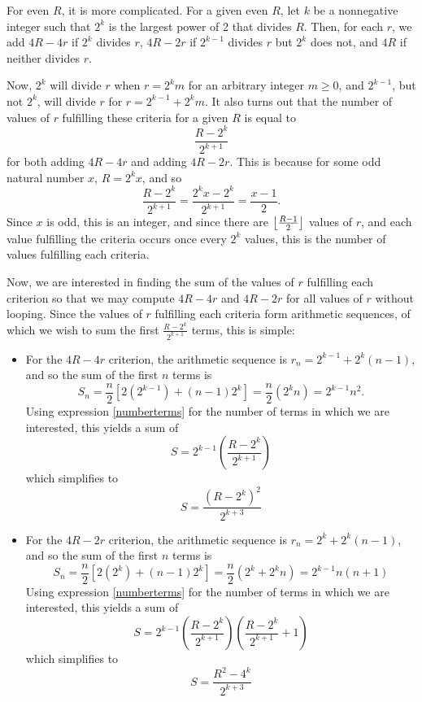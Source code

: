 \documentclass[12pt]{article}
\DeclarePairedDelimiter\floor{\lfloor}{\rfloor}
\begin{document}
For even $R$, it is more complicated. For a given even $R$, let $k$ be a nonnegative integer such that $2^k$ is the largest power of 2 that divides $R$. Then, for each $r$, we add $4R - 4r$ if $2^k$ divides $r$, $4R - 2r$ if $2^{k-1}$ divides $r$ but $2^k$ does not, and $4R$ if neither divides $r$.

Now, $2^k$ will divide $r$ when $r = 2^k m$ for an arbitrary integer $m \ge 0$, and $2^{k-1}$, but not $2^k$, will divide $r$ for $r = 2^{k-1} + 2^k m$. It also turns out that the number of values of $r$ fulfilling these criteria for a given $R$ is equal to
\begin{equation}
  \frac{R - 2^k}{2^{k+1}} \label{numberterms}
\end{equation}
for both adding $4R - 4r$ and adding $4R - 2r$. This is because for some odd natural number $x$, $R = 2^k x$, and so \[ \frac{R - 2^k}{2^{k+1}} = \frac{2^k x - 2^k}{2^{k+1}} = \frac{x - 1}{2}. \] Since $x$ is odd, this is an integer, and since there are $\floor*{\frac{R-1}{2}}$ values of $r$, and each value fulfilling the criteria occurs once every $2^k$ values, this is the number of values fulfilling each criteria.

Now, we are interested in finding the sum of the values of $r$ fulfilling each criterion so that we may compute $4R - 4r$ and $4R - 2r$ for all values of $r$ without looping. Since the values of $r$ fulfilling each criteria form arithmetic sequences, of which we wish to sum the first $\frac{R - 2^k}{2^{k+1}}$ terms, this is simple:
\begin{itemize}
  \item For the $4R - 4r$ criterion, the arithmetic sequence is $r_n = 2^{k - 1} + 2^k(n - 1)$, and so the sum of the first $n$ terms is \[ S_n = \frac{n}{2}[2(2^{k - 1}) + (n-1)2^k] = \frac{n}{2}(2^k n) = 2^{k-1} n^2. \] Using expression \ref{numberterms} for the number of terms in which we are interested, this yields a sum of \[ S = 2^{k - 1}\left( \frac{R-2^k}{2^{k+1}} \right) \] which simplifies to
  \begin{equation}
    S = \frac{(R - 2^k)^2}{2^{k+3}} \label{fourRfourr}
  \end{equation}
  \item For the $4R - 2r$ criterion, the arithmetic sequence is $r_n = 2^k + 2^k(n - 1)$, and so the sum of the first $n$ terms is \[ S_n = \frac{n}{2}[2(2^k) + (n-1)2^k] = \frac{n}{2}(2^k + 2^k n) = 2^{k-1} n (n + 1) \] Using expression \ref{numberterms} for the number of terms in which we are interested, this yields a sum of \[ S = 2^{k - 1}\left( \frac{R-2^k}{2^{k+1}} \right) \left( \frac{R-2^k}{2^{k+1}} + 1 \right) \] which simplifies to
  \begin{equation}
    S = \frac{R^2 - 4^k}{2^{k+3}} \label{fourRtwor}
  \end{equation}
\end{itemize}
\end{document}
